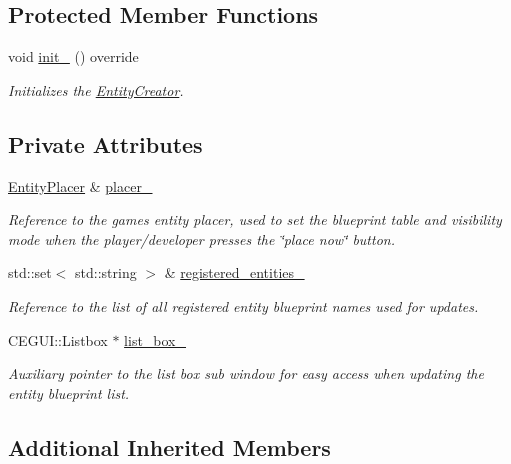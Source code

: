\subsection*{Protected Member Functions}
\begin{DoxyCompactItemize}
\item 
void \hyperlink{class_entity_creator_a6450f0e4239b4eb3dc3c8224371c564f}{init\+\_\+} () override
\begin{DoxyCompactList}\small\item\em Initializes the \hyperlink{class_entity_creator}{Entity\+Creator}. \end{DoxyCompactList}\end{DoxyCompactItemize}
\subsection*{Private Attributes}
\begin{DoxyCompactItemize}
\item 
\hyperlink{class_entity_placer}{Entity\+Placer} \& \hyperlink{class_entity_creator_a9391bd0312fc88528dbb7533a835daaf}{placer\+\_\+}
\begin{DoxyCompactList}\small\item\em Reference to the game\textquotesingle{}s entity placer, used to set the blueprint table and visibility mode when the player/developer presses the \char`\"{}place now\char`\"{} button. \end{DoxyCompactList}\item 
std\+::set$<$ std\+::string $>$ \& \hyperlink{class_entity_creator_a15d7d05f00f1fadb0bbba6170b98c2e1}{registered\+\_\+entities\+\_\+}
\begin{DoxyCompactList}\small\item\em Reference to the list of all registered entity blueprint names used for updates. \end{DoxyCompactList}\item 
C\+E\+G\+U\+I\+::\+Listbox $\ast$ \hyperlink{class_entity_creator_a8bed2a552aa8b2292564d50be8a3baaa}{list\+\_\+box\+\_\+}
\begin{DoxyCompactList}\small\item\em Auxiliary pointer to the list box sub window for easy access when updating the entity blueprint list. \end{DoxyCompactList}\end{DoxyCompactItemize}
\subsection*{Additional Inherited Members}


